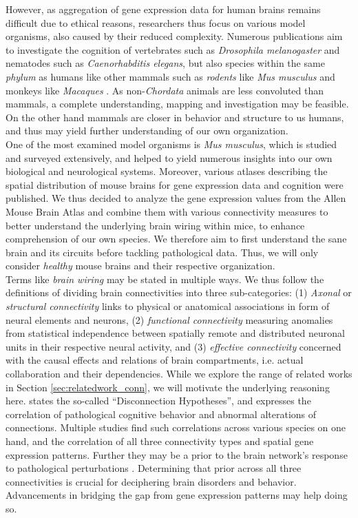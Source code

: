 \documentclass[]{article}
\renewcommand{\cite}{\citep}
\begin{document}
However, as aggregation of gene expression data for human brains remains difficult due to ethical reasons, researchers thus focus on various model organisms, also caused by their reduced complexity. Numerous publications aim to investigate the cognition of vertebrates such as \textit{Drosophila melanogaster} and nematodes such as \textit{Caenorhabditis elegans}, but also species within the same \textit{phylum} as humans like other mammals such as \textit{rodents} like \textit{Mus musculus} \cite{bohland2010clustering} and monkeys like \textit{Macaques} \cite{ValkShapingBrainStructure2020}. As non-\textit{Chordata} animals are less convoluted than mammals, a complete understanding, mapping and investigation may be feasible. On the other hand mammals are closer in behavior and structure to us humans, and thus may yield further understanding of our own organization. \\
One of the most examined model organisms is \textit{Mus musculus}, which is studied and surveyed extensively, and helped to yield numerous insights into our own biological and neurological systems. Moreover, various atlases describing the spatial distribution of mouse brains for gene expression data and cognition were published. We thus decided to analyze the gene expression values from the Allen Mouse Brain Atlas and combine them with various connectivity measures to better understand the underlying brain wiring within mice, to enhance comprehension of our own species. We therefore aim to first understand the sane brain and its circuits before tackling pathological data. Thus, we will only consider \textit{healthy} mouse brains and their respective organization.\\

Terms like \textit{brain wiring} may be stated in multiple ways. We thus follow the definitions of \citet{sporns2016networks} dividing brain connectivities into three sub-categories: (1) \textit{Axonal} or \textit{structural connectivity} links to physical or anatomical associations in form of neural elements and neurons, (2) \textit{functional connectivity} measuring anomalies from statistical independence between spatially remote and distributed neuronal units in their respective neural activity, and (3) \textit{effective connectivity} concerned with the causal effects and relations of brain compartments, i.e. actual collaboration and their dependencies. While we explore the range of related works in Section \ref{sec:relatedwork_conn}, we will motivate the underlying reasoning here. \citet{friston2002dysfunctional} states the so-called ``Disconnection Hypotheses'', and expresses the correlation of pathological cognitive behavior and abnormal alterations of connections. Multiple studies find such correlations across various species on one hand, and the correlation of all three connectivity types and spatial gene expression patterns. Further they may be a prior to the brain network's response to pathological perturbations \cite{fornito2015connectomics}. Determining that prior across all three connectivities is crucial for deciphering brain disorders and behavior. Advancements in bridging the gap from gene expression patterns may help doing so.\\
\end{document}
